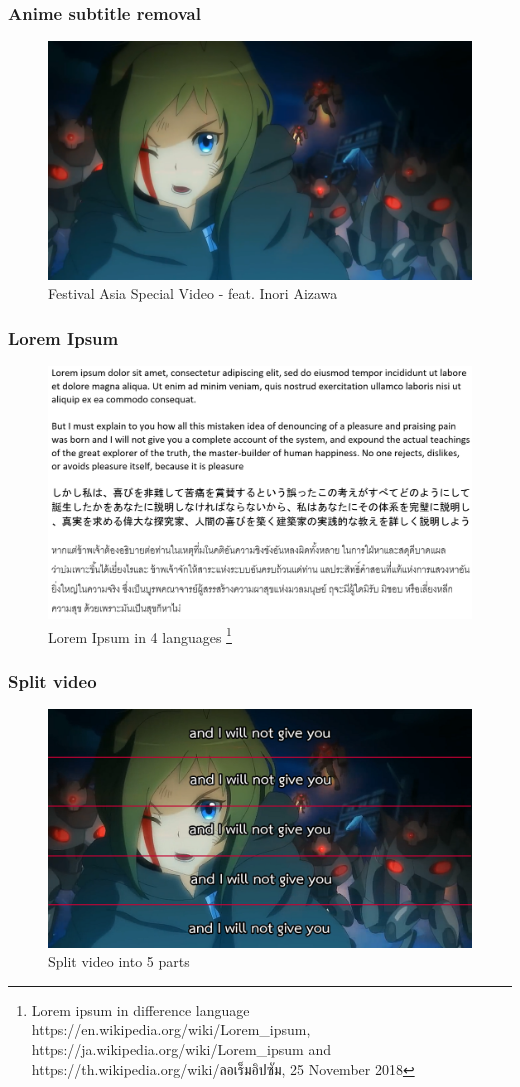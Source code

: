 \documentclass[xcolor=dvipsnames, xetex,serif]{beamer}
\begin{document}
    \begin{frame}
        \frametitle{Anime subtitle removal}
        \begin{figure}[H]
            \centering
            \includegraphics[width=0.8\linewidth]{images/inori-preview.png}
            \caption{ Festival Asia Special Video - feat. Inori Aizawa }
        \end{figure}
    \end{frame}
    \begin{frame}
        \frametitle{Lorem Ipsum}
            \begin{figure}[H]
            \centering
            \includegraphics[width=0.85\linewidth]{images/lorem4lang.png}
            \caption{Lorem Ipsum in 4 languages \footnote{ \tiny{Lorem ipsum in difference language https://en.wikipedia.org/wiki/Lorem\_ipsum,  https://ja.wikipedia.org/wiki/Lorem\_ipsum and  https://th.wikipedia.org/wiki/ลอเร็มอิปซัม, 25 November 2018} } }
        \end{figure}
    \end{frame}
    \begin{frame}
        \frametitle{Split video}
            \begin{figure}[H]
            \centering
            \includegraphics[width=0.8\linewidth]{images/inori-subbed-preview.png}
            \caption{Split video into 5 parts}
        \end{figure}
    \end{frame}
\end{document}
